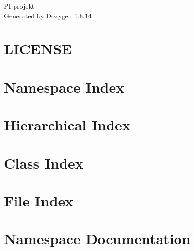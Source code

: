 \documentclass[twoside]{book}
\newcommand{\+}{\discretionary{\mbox{\scriptsize$\hookleftarrow$}}{}{}}
\newcommand{\clearemptydoublepage}{%
  \newpage{\pagestyle{empty}\cleardoublepage}%
}
\begin{document}
\hypersetup{pageanchor=false,
             bookmarksnumbered=true,
             pdfencoding=unicode
            }
\begin{titlepage}
\vspace*{7cm}
\begin{center}%
{\Large PI projekt }\\
\vspace*{1cm}
{\large Generated by Doxygen 1.8.14}\\
\end{center}
\end{titlepage}
\clearemptydoublepage
{}
\tableofcontents
\clearemptydoublepage
{}
\hypersetup{pageanchor=true}

\chapter{L\+I\+C\+E\+N\+SE}
\label{md_packages__newtonsoft_8_json_811_80_82__l_i_c_e_n_s_e}

\chapter{Namespace Index}

\chapter{Hierarchical Index}

\chapter{Class Index}

\chapter{File Index}

\chapter{Namespace Documentation}











\end{document}

